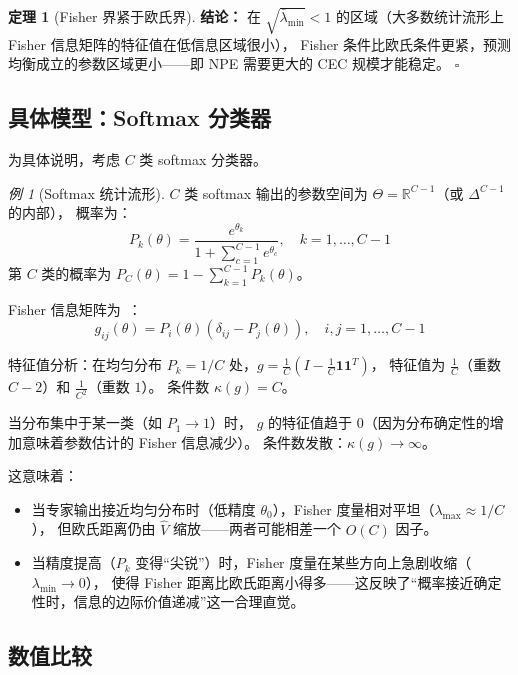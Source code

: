 \documentclass[12pt,a4paper]{article}
\theoremstyle{definition}
\newtheorem{theorem}{定理}[section]
\theoremstyle{remark}
\newtheorem{example}{例}[section]
\newcommand{\R}{\mathbb{R}}
\newcommand{\Fisher}{g}
\begin{document}
\begin{theorem}[Fisher 界紧于欧氏界]
\textbf{结论：} 在 $\sqrt{\bar{\lambda}_{\min}} < 1$ 的区域（大多数统计流形上 Fisher 信息矩阵的特征值在低信息区域很小），
Fisher 条件比欧氏条件更紧，预测均衡成立的参数区域更小——即 NPE 需要更大的 CEC 规模才能稳定。
$\square$
\end{theorem}

\subsection{具体模型：Softmax 分类器}

为具体说明，考虑 $C$ 类 softmax 分类器。

\begin{example}[Softmax 统计流形]
$C$ 类 softmax 输出的参数空间为 $\Theta = \R^{C-1}$（或 $\Delta^{C-1}$ 的内部），
概率为：
\begin{equation}
    P_k(\theta) = \frac{e^{\theta_k}}{1 + \sum_{c=1}^{C-1} e^{\theta_c}}, \quad k=1,\dots,C-1
\end{equation}
第 $C$ 类的概率为 $P_C(\theta) = 1 - \sum_{k=1}^{C-1} P_k(\theta)$。

Fisher 信息矩阵为~\cite{amari2016information}：
\begin{equation}
    \Fisher_{ij}(\theta) = P_i(\theta)(\delta_{ij} - P_j(\theta)), \quad i,j = 1,\dots,C-1 \label{eq:softmax_fisher}
\end{equation}

特征值分析：在均匀分布 $P_k = 1/C$ 处，$\Fisher = \frac{1}{C}(I - \frac{1}{C}\mathbf{1}\mathbf{1}^T)$，
特征值为 $\frac{1}{C}$（重数 $C-2$）和 $\frac{1}{C^2}$（重数 $1$）。
条件数 $\kappa(\Fisher) = C$。

当分布集中于某一类（如 $P_1 \to 1$）时，
$\Fisher$ 的特征值趋于 $0$（因为分布确定性的增加意味着参数估计的 Fisher 信息减少）。
条件数发散：$\kappa(\Fisher) \to \infty$。
\end{example}

这意味着：
\begin{itemize}
    \item 当专家输出接近均匀分布时（低精度 $\theta_0$），Fisher 度量相对平坦（$\lambda_{\max} \approx 1/C$），
    但欧氏距离仍由 $\hat{V}$ 缩放——两者可能相差一个 $O(C)$ 因子。
    \item 当精度提高（$P_k$ 变得“尖锐”）时，Fisher 度量在某些方向上急剧收缩（$\lambda_{\min} \to 0$），
    使得 Fisher 距离比欧氏距离小得多——这反映了“概率接近确定性时，信息的边际价值递减”这一合理直觉。
\end{itemize}

\subsection{数值比较}
\end{document}
